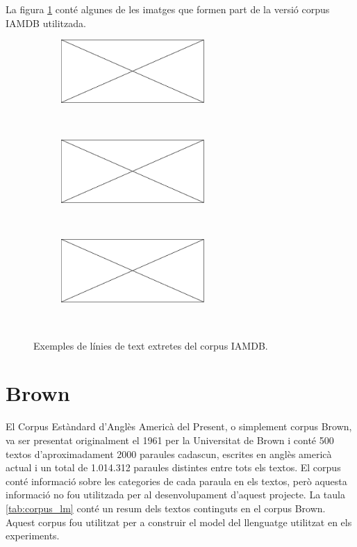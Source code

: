La figura \ref{fig:iamdb_examples} conté algunes de les imatges que formen part de la versió corpus IAMDB utilitzada.
\begin{figure}
\centering
\begin{subfigure}[b]{0.8\textwidth}
\centering
\includegraphics[width=0.6\textwidth]{images/pending_image.eps}
\end{subfigure}\\
\begin{subfigure}[b]{0.8\textwidth}
\centering
\includegraphics[width=0.6\textwidth]{images/pending_image.eps}
\end{subfigure}\\
\begin{subfigure}[b]{0.8\textwidth}
\centering
\includegraphics[width=0.6\textwidth]{images/pending_image.eps}
\end{subfigure}\\
\caption{Exemples de línies de text extretes del corpus IAMDB.}\label{fig:iamdb_examples}
\end{figure}

\section{Brown}\label{sec:corpus_brown}
El Corpus Estàndard d'Anglès Americà del Present, o simplement corpus Brown, va ser presentat originalment el 1961\cite{francis1979brown} per la Universitat de Brown i conté 500 textos d'aproximadament 2000 paraules cadascun, escrites en anglès americà actual i un total de 1.014.312 paraules distintes entre tots els textos. El corpus conté informació sobre les categories de cada paraula en els textos, però aquesta informació no fou utilitzada per al desenvolupament d'aquest projecte. La taula \ref{tab:corpus_lm} conté un resum dels textos continguts en el corpus Brown. Aquest corpus fou utilitzat per a construir el model del llenguatge utilitzat en els experiments.

